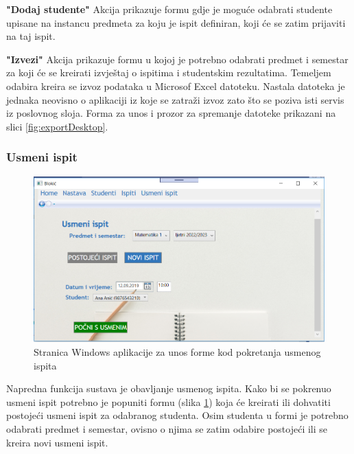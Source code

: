\documentclass[times, utf8, diplomski]{fer}
\begin{document}
\hfill\break
\textbf{"Dodaj studente"} \hfill\break
Akcija prikazuje formu gdje je moguće odabrati studente upisane na instancu predmeta za koju je ispit definiran, koji će se zatim prijaviti na taj ispit.

\hfill\break
\textbf{"Izvezi"} \hfill\break
Akcija prikazuje formu u kojoj je potrebno odabrati predmet i semestar za koji će se kreirati izvještaj o ispitima i studentskim rezultatima. Temeljem odabira kreira se izvoz podataka u Microsof Excel datoteku. Nastala datoteka je jednaka neovisno o aplikaciji iz koje se zatraži izvoz zato što se poziva isti servis iz poslovnog sloja. Forma za unos i prozor za spremanje datoteke prikazani na slici \ref{fig:exportDesktop}.



\subsubsection{Usmeni ispit}
\begin{figure}[htb]
\centering
\includegraphics[width=12cm]{oral.PNG}
\caption{Stranica Windows aplikacije za unos forme kod pokretanja usmenog ispita}
\label{fig:oral}
\end{figure}


Napredna funkcija sustava je obavljanje usmenog ispita. Kako bi se pokrenuo usmeni ispit potrebno je popuniti formu (slika \ref{fig:oral}) koja će kreirati ili dohvatiti postojeći usmeni ispit za odabranog studenta. Osim studenta u formi je potrebno odabrati predmet i semestar, ovisno o njima se zatim odabire postojeći ili se kreira novi usmeni ispit.
\end{document}
